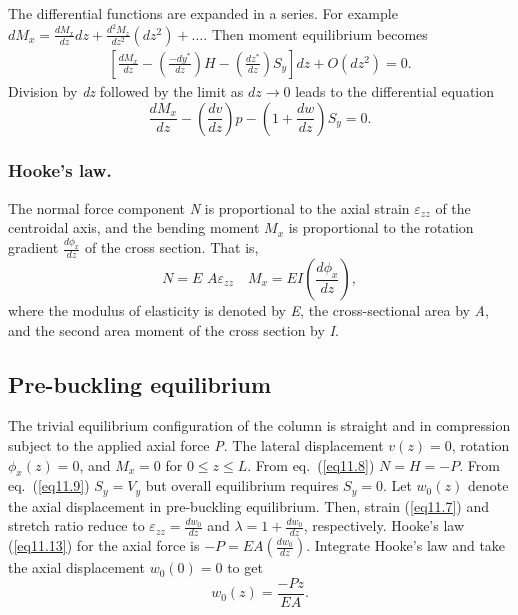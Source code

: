 \documentclass{AeroStructure-ERJohnson}
\begin{document}
The differential functions are expanded in a series. For example $ d M_{x}=\frac{d M_{x}}{d z} d z+\frac{d^{2} M_{z}}{d z^{2}}\left(d z^{2}\right)+\ldots.$ Then moment equilibrium becomes
\begin{align}\label{eq11.11}
 \left[\frac{d M_{x}}{d z}-\left(\frac{-d y^{*}}{d z}\right) H-\left(\frac{d z^{*}}{d z}\right) S_{y}\right] d z+O\left(d z^{2}\right)=0.
\end{align}
Division by \textit{dz} followed by the limit as $ d z \rightarrow 0 $ leads to the differential equation
\begin{equation}
\frac{d M_{x}}{d z}-\left(\frac{d v}{d z}\right) p-\left(1+\frac{d w}{d z}\right) S_{y}=0. \label{eq11.12}
\end{equation}
\vspace*{5pt}
\clearpage

\subsubsection{Hooke's law.} The normal force component \textit{N} is proportional to the axial strain $\varepsilon_{zz}$ of the centroidal axis, and the bending moment $M_{x}$ is proportional to the rotation gradient $\frac{d \phi_{x}}{d z}$ of the cross section. That is,
\begin{equation}
N=\textit{E A} \varepsilon_{z z} \quad M_{x}=E I\left(\frac{d \phi_{x}}{d z}\right), \label{eq11.13}
\end{equation}
where the modulus of elasticity is denoted by \textit{E}, the cross-sectional area by \textit{A}, and the second area moment of the cross section by \textit{I}.

\subsection{Pre-buckling equilibrium}\label{sec11.1.1}

The trivial equilibrium configuration of the column is straight and in compression subject to the applied axial force \textit{P}. The lateral displacement $ v(z)=0 $, rotation $ \phi_{x}(z)=0 $, and $ M_{x}=0 $ for $ 0 \leq z \leq L $. From eq.~(\ref{eq11.8}) ${N=H=-P}$. From eq.~(\ref{eq11.9}) $ S_{y}=V_{y} $ but overall equilibrium requires $ S_{y}=0 $. Let $ w_{0}(z) $ denote the axial displacement in pre-buckling equilibrium. Then, strain (\ref{eq11.7}) and stretch ratio reduce to $\varepsilon_{zz}=\frac{d w_{0}}{d z} $ and $ \lambda=1+\frac{d w_{0}}{d z} $, respectively. Hooke's law (\ref{eq11.13}) for the axial force is $ -P=E A\left(\frac{d w_{0}}{d z}\right) $. Integrate Hooke's law and take the axial displacement $ w_{0}(0)=0 $ to get
\begin{equation}
w_{0}(z)=\frac{-P z}{E A}. \label{eq11.14}
\end{equation}
\end{document}
